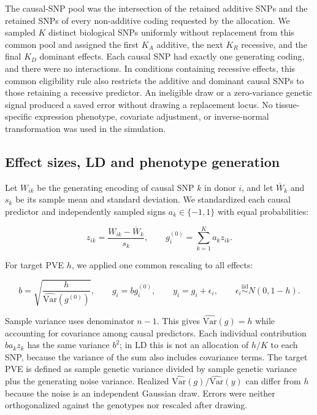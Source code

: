 \documentclass[12pt]{article}
\begin{document}
The causal-SNP pool was the intersection of the retained additive SNPs
and the retained SNPs of every non-additive coding requested by the
allocation. We sampled $K$ distinct biological SNPs uniformly without
replacement from this common pool and assigned the first $K_A$ additive,
the next $K_R$ recessive, and the final $K_D$ dominant effects. Each
causal SNP had exactly one generating coding, and there were no
interactions. In conditions containing recessive effects, this common
eligibility rule also restricts the additive and dominant causal SNPs
to those retaining a recessive predictor. An ineligible draw or a
zero-variance genetic signal produced a saved error without drawing a
replacement locus. No tissue-specific expression phenotype, covariate
adjustment, or inverse-normal transformation was used in the simulation.

\subsection{Effect sizes, LD and phenotype generation}

Let $W_{ik}$ be the generating encoding of causal SNP $k$ in donor $i$,
and let $\overline{W}_k$ and $s_k$ be its sample mean and standard
deviation. We standardized each causal predictor and independently
sampled signs $a_k\in\{-1,1\}$ with equal probabilities:

\begin{equation}
z_{ik}=\frac{W_{ik}-\overline{W}_k}{s_k},\qquad
 g_i^{(0)}=\sum_{k=1}^{K}a_k z_{ik}.
\end{equation}

For target PVE $h$, we applied one common rescaling to all effects:

\begin{equation}
b=\sqrt{\frac{h}{\widehat{\mathrm{Var}}(g^{(0)})}},\qquad
 g_i=b g_i^{(0)},\qquad y_i=g_i+\epsilon_i,\qquad
 \epsilon_i\stackrel{\mathrm{iid}}{\sim}N(0,1-h).
\end{equation}

Sample variance uses denominator $n-1$. This gives
$\widehat{\mathrm{Var}}(g)=h$ while accounting for covariance among
causal predictors. Each individual contribution $b a_k z_k$ has the
same variance $b^2$; in LD this is not an allocation of $h/K$ to each
SNP, because the variance of the sum also includes covariance terms.
The target PVE is defined as sample genetic variance divided by sample
genetic variance plus the generating noise variance. Realized
$\widehat{\mathrm{Var}}(g)/\widehat{\mathrm{Var}}(y)$ can differ from
$h$ because the noise is an independent Gaussian draw. Errors were
neither orthogonalized against the genotypes nor rescaled after drawing.
\end{document}
